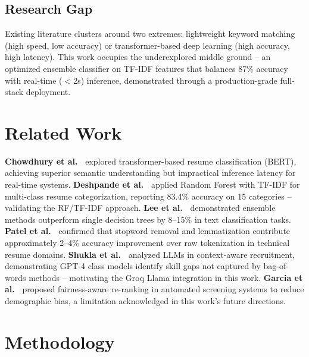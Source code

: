 \documentclass[10pt,twocolumn]{article}
\begin{document}
\subsection{Research Gap}
Existing literature clusters around two extremes: lightweight keyword matching (high speed, low accuracy) or transformer-based deep learning (high accuracy, high latency). This work occupies the underexplored middle ground -- an optimized ensemble classifier on TF-IDF features that balances 87\% accuracy with real-time ($<$2s) inference, demonstrated through a production-grade full-stack deployment.

\section{Related Work}

\textbf{Chowdhury et al.\ \cite{chowdhury2023}} explored transformer-based resume classification (BERT), achieving superior semantic understanding but impractical inference latency for real-time systems. \textbf{Deshpande et al.\ \cite{deshpande2020}} applied Random Forest with TF-IDF for multi-class resume categorization, reporting 83.4\% accuracy on 15 categories -- validating the RF/TF-IDF approach. \textbf{Lee et al.\ \cite{lee2022}} demonstrated ensemble methods outperform single decision trees by 8--15\% in text classification tasks. \textbf{Patel et al.\ \cite{patel2021}} confirmed that stopword removal and lemmatization contribute approximately 2--4\% accuracy improvement over raw tokenization in technical resume domains. \textbf{Shukla et al.\ \cite{shukla2024}} analyzed LLMs in context-aware recruitment, demonstrating GPT-4 class models identify skill gaps not captured by bag-of-words methods -- motivating the Groq Llama integration in this work. \textbf{Garcia et al.\ \cite{garcia2023}} proposed fairness-aware re-ranking in automated screening systems to reduce demographic bias, a limitation acknowledged in this work's future directions.

\section{Methodology}
\end{document}
